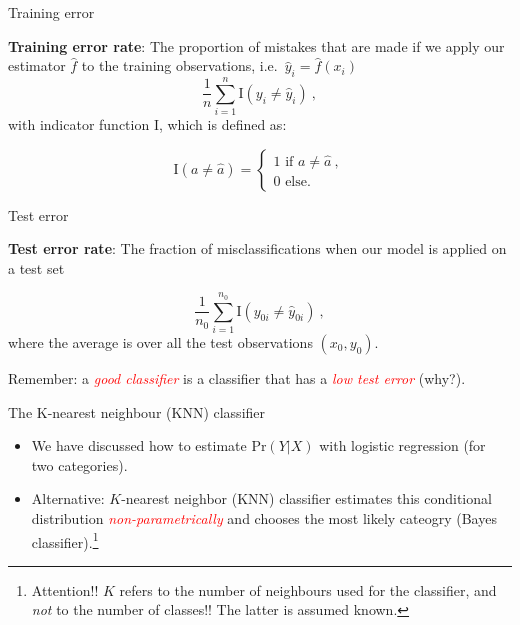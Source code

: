 \documentclass[
  10pt,
  ignorenonframetext,
]{beamer}
\providecommand{\tightlist}{%
  \setlength{\itemsep}{0pt}\setlength{\parskip}{0pt}}
\begin{document}
\begin{frame}
\begin{block}{Training error}
\protect\hypertarget{training-error}{}
\(~\)

\textbf{Training error rate}: The proportion of mistakes that are made
if we apply our estimator \(\hat{f}\) to the training observations,
i.e.~\(\hat{y}_i=\hat{f}(x_i)\)
\[\frac{1}{n}\sum_{i=1}^n \text{I}(y_i \neq \hat{y}_i) \ ,\] with
indicator function I, which is defined as:

\[\text{I}(a\neq\hat{a}) = \begin{cases} 1 \text{ if } a \neq \hat{a} \ , \\ 
0 \text{ else. } \end{cases}\]

\vspace{2mm}
\end{block}
\end{frame}

\begin{frame}
\begin{block}{Test error}
\protect\hypertarget{test-error}{}
\(~\)

\textbf{Test error rate}: The fraction of misclassifications when our
model is applied on a test set

\[\frac{1}{n_0}\sum_{i=1}^{n_0} \text{I}(y_{0i} \neq \hat{y}_{0i}) \ ,\]
where the average is over all the test observations \((x_0,y_0)\).

\vspace{6mm}

Remember: a \emph{\textcolor{red}{good classifier}} is a classifier that
has a \emph{\textcolor{red}{low test error}} (why?).
\end{block}
\end{frame}

\begin{frame}{The K-nearest neighbour (KNN) classifier}
\protect\hypertarget{the-k-nearest-neighbour-knn-classifier}{}
\begin{itemize}
\tightlist
\item
  We have discussed how to estimate \(\text{Pr}(Y | X)\) with logistic
  regression (for two categories).
\end{itemize}

\vspace{1mm}

\vspace{1mm}

\begin{itemize}
\tightlist
\item
  Alternative: \(K\)-nearest neighbor (KNN) classifier estimates this
  conditional distribution \emph{\textcolor{red}{non-parametrically}}
  and chooses the most likely cateogry (Bayes
  classifier).\footnote{Attention!! $K$ refers to the number of neighbours used for the classifier, and \emph{not} to the number of classes!! The latter is assumed known.}
\end{itemize}
\end{frame}
\end{document}
